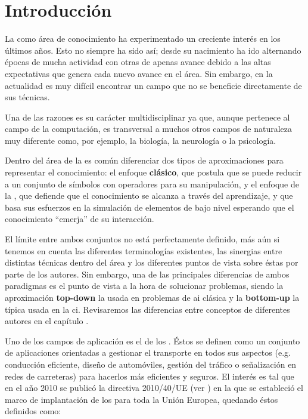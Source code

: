 \chapter{Introducción}
\label{ch:intro}

La  como área de conocimiento ha experimentado un creciente interés en los últimos años. Esto no siempre ha sido así; desde su nacimiento ha ido alternando épocas de mucha actividad con otras de apenas avance debido a las altas expectativas que genera cada nuevo avance en el área. Sin embargo, en la actualidad es muy difícil encontrar un campo que no se beneficie directamente de sus técnicas.

Una de las razones es su carácter multidisciplinar ya que, aunque pertenece al campo de la computación, es transversal a muchos otros campos de naturaleza muy diferente como, por ejemplo, la biología, la neurología o la psicología.

Dentro del área de la  es común diferenciar dos tipos de aproximaciones para representar el conocimiento: el enfoque \textbf{clásico}, que postula que se puede reducir a un conjunto de símbolos con operadores para su manipulación, y el enfoque de la , que defiende que el conocimiento se alcanza a través del aprendizaje, y que basa sus esfuerzos en la simulación de elementos de bajo nivel esperando que el conocimiento \enquote{emerja} de su interacción.

El límite entre ambos conjuntos no está perfectamente definido, más aún si tenemos en cuenta las diferentes terminologías existentes, las sinergias entre distintas técnicas dentro del área y los diferentes puntos de vista sobre éstas por parte de los autores. Sin embargo, una de las principales diferencias de ambos paradigmas es el punto de vista a la hora de solucionar problemas, siendo la aproximación \textbf{top-down} la usada en problemas de \acrshort{ai} clásica y la \textbf{bottom-up} la típica usada en la \acrshort{ci}. Revisaremos las diferencias entre conceptos de diferentes autores en el capítulo .

Uno de los campos de aplicación es el de los . Éstos se definen como un conjunto de aplicaciones orientadas a gestionar el transporte en todos sus aspectos (e.g. conducción eficiente, diseño de automóviles, gestión del tráfico o señalización en redes de carreteras) para hacerlos más eficientes y seguros. El interés es tal que en el año 2010 se publicó la directiva 2010/40/UE (ver \cite{parliament2010directive}) en la que se estableció el marco de implantación de los  para toda la Unión Europea, quedando éstos definidos como:

